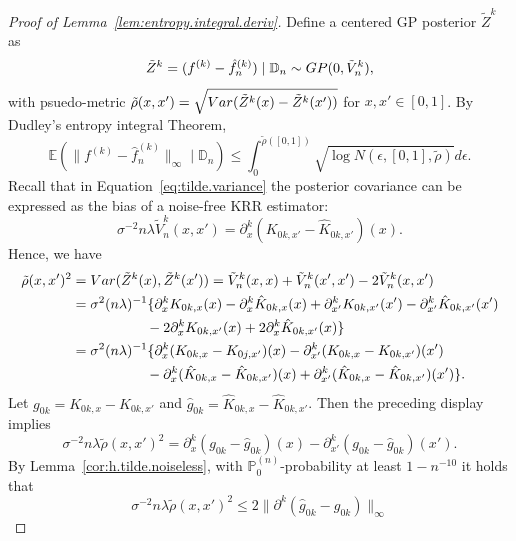 \documentclass[12pt]{article}
\newcommand\data{\mathbb{D}_n}
\newcommand{\EE}{\mathbb{E}}
\newcommand{\PP}{\mathbb{P}}
\theoremstyle{plain}
\theoremstyle{nonitalicremark}
\begin{document}
\begin{appendices}
\begin{proof}[Proof of Lemma~\ref{lem:entropy.integral.deriv}]
Define a centered GP posterior $\tilde{Z}^k$ as
\begin{equation}\label{eq:centered.GP.tilde}
\tilde{Z}^k=(f^{(k)}-\hat{f}^{(k)}_n)\mid \data\sim {\rm GP}(0, \tilde{V}_n^k),
\end{equation}
with psuedo-metric $\tilde{\rho}(x,x')=\sqrt{{\rm Var}(\tilde{Z}^k(x)-\tilde{Z}^k(x'))}$ for $x,x'\in[0,1]$. By Dudley’s entropy integral Theorem,
\begin{equation}
\EE \left( \|f^{(k)}-\hat{f}^{(k)}_n\|_\infty \mid \data \right) \leq \int_0^{\tilde{\rho}([0,1])} \sqrt{\log N(\epsilon,[0,1],\tilde{\rho})}d\epsilon.
\end{equation}
Recall that in Equation~\eqref{eq:tilde.variance} the posterior covariance can be expressed as the bias of a noise-free KRR estimator:
\begin{equation}
\sigma^{-2}n\lambda \tilde{V}^k_n(x,x')=\partial^k_x(K_{0k,x'}-\hat{K}_{0k,x'})(x).
\end{equation}
Hence, we have
\begin{align}
\tilde{\rho}(x,x')^2&={\rm Var}(\tilde{Z}^k(x),\tilde{Z}^k(x'))=\tilde{V}^k_n(x,x)+\tilde{V}^k_n(x',x')-2\tilde{V}^k_n(x,x')\\
&= \sigma^2 (n \lambda)^{-1} \{\partial^k_xK_{0k,x}(x) - \partial^k_x\hat{K}_{0k,x}(x)+\partial^k_{x'}K_{0k,x'}(x') - \partial^k_{x'}\hat{K}_{0k,x'}(x')\\
&\qquad\qquad\quad\ -2\partial^k_xK_{0k,x'}(x) +2\partial^k_x \hat{K}_{0k,x'}(x)\}\\
&= \sigma^2 (n \lambda)^{-1} \{\partial^k_x(K_{0k,x}-K_{0j,x'})(x) - \partial^k_{x'}(K_{0k,x}-K_{0k,x'})(x') \\
&\qquad\qquad\quad\ - \partial^k_x(\hat{K}_{0k,x}-\hat{K}_{0k,x'})(x)+ \partial^k_{x'}(\hat{K}_{0k,x}-\hat{K}_{0k,x'})(x')\}.
\end{align}
Let $g_{0k}=K_{0k,x}-K_{0k,x'}$ and $\hat{g}_{0k}=\hat{K}_{0k,x}-\hat{K}_{0k,x'}$. Then the preceding display implies
\begin{equation}
\sigma^{-2}n\lambda\tilde{\rho}(x,x')^2=\partial^k_x(g_{0k}-\hat{g}_{0k})(x)-\partial^k_{x'}(g_{0k}-\hat{g}_{0k})(x').
\end{equation}
By Lemma~\ref{cor:h.tilde.noiseless}, with $\PP_0^{(n)}$-probability at least $1 - n^{-10}$ it holds that
\begin{equation}\label{eq:rho.decomposition.tilde}
\sigma^{-2}n\lambda\tilde{\rho}(x,x')^2 \leq 2\|\partial^k(\hat{g}_{0k}-g_{0k})\|_\infty

\end{equation}
\end{proof}
\end{appendices}
\end{document}
